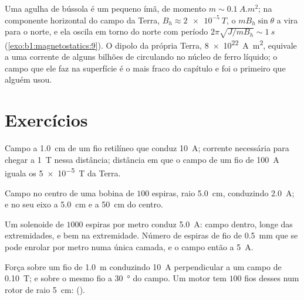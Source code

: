 \begin{example}\label{ex:b1:magnetostatics:compass}
Uma agulha de bússola é um pequeno ímã, de momento $m \sim \qty{0.1}{A.m^2}$; na
componente horizontal do campo da Terra, $B_h \approx \qty{2e-5}{T}$, o
 $mB_h\sin\theta$ a vira para o norte, e ela oscila em torno do norte com
período $2\pi\sqrt{J/mB_h} \sim \qty{1}{s}$ (\cref{exo:b1:magnetostatics:9}).
O dipolo da própria Terra, \qty{8e22}{A.m^2}, equivale a uma corrente de
alguns bilhões de  circulando no núcleo de ferro líquido; o campo que ele
faz na superfície é o mais fraco do capítulo e foi o primeiro que
alguém usou.
\end{example}

\section{Exercícios}

\begin{exercise}[$\star$]\label{exo:b1:magnetostatics:1}
Campo a \qty{1.0}{cm} de um fio retilíneo que conduz \qty{10}{A}; corrente
necessária para chegar a \qty{1}{T} nessa distância; distância em que o campo de um
fio de \qty{100}{A} iguala os \qty{5e-5}{T} da Terra.
\end{exercise}

\begin{exercise}[$\star$]\label{exo:b1:magnetostatics:2}
Campo no centro de uma bobina de $100$ espiras, raio \qty{5.0}{cm},
conduzindo \qty{2.0}{A}; e no seu eixo a \qty{5.0}{cm} e a \qty{50}{cm}
do centro.
\end{exercise}

\begin{exercise}[$\star$]\label{exo:b1:magnetostatics:3}
Um solenoide de $1000$ espiras por metro conduz \qty{5.0}{A}: campo dentro,
longe das extremidades, e bem na extremidade. Número de espiras de fio de
\qty{0.5}{mm} que se pode enrolar por metro numa única camada, e o campo então
a \qty{5}{A}.
\end{exercise}

\begin{exercise}[$\star$]\label{exo:b1:magnetostatics:4}
Força sobre um fio de \qty{1.0}{m} conduzindo \qty{10}{A} perpendicular a um
campo de \qty{0.10}{T}; e sobre o mesmo fio a \qty{30}{\degree} do campo.
Um motor tem $100$ fios desses num rotor de raio \qty{5}{cm}: 
().
\end{exercise}

